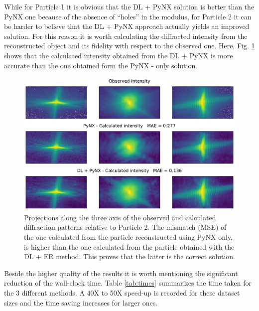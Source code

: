 While for Particle 1 it is obvious that the DL + PyNX solution is better than the PyNX one because of the absence of ``holes''
in the modulus, for Particle 2 it can be harder to believe that the DL + PyNX approach actually yields an improved solution. 
For this reason it is worth calculating the diffracted intensity from the reconstructed object and its fidelity with respect 
to the observed one. Here, Fig. \ref{fig:dlpynx_proj2} shows that the calculated intensity obtained from the DL + PyNX 
is more accurate than the one obtained form the PyNX - only solution. 

\begin{figure}[H]
    \centering
    \includegraphics[width=\textwidth]{figures/Phasing/proj_dlpynx2.pdf}
    \caption{Projections along the three axis of the observed and calculated diffraction patterns relative to Particle 2. 
    The mismatch (MSE) of the one calculated from the particle reconstructed using PyNX only, is higher than the one calculated 
    from the particle obtained with the DL + ER method. This proves that the latter is the correct solution. }
    \label{fig:dlpynx_proj2}
\end{figure}

Beside the higher quality of the results it is worth mentioning the significant reduction of the wall-clock time. 
Table \ref{tab:times} summarizes the time taken for the 3 different methods. A 40X to 50X speed-up is recorded for 
these dataset sizes and the time saving increases for larger ones.

